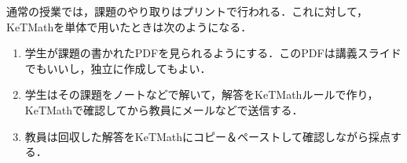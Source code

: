 \documentclass[a4j,12pt]{ujarticle}
\begin{document}
通常の授業では，課題のやり取りはプリントで行われる．これに対して，
KeTMathを単体で用いたときは次のようになる．\vspace{-1mm}
\begin{enumerate}
\item 学生が課題の書かれたPDFを見られるようにする．このPDFは講義スライドでもいいし，独立に作成してもよい．\vspace{-2mm}
\item 学生はその課題をノートなどで解いて，解答をKeTMathルールで作り，
KeTMathで確認してから教員にメールなどで送信する．\vspace{-2mm}
\item 教員は回収した解答をKeTMathにコピー＆ペーストして確認しながら採点する．\vspace{-1mm}
\end{enumerate}
\end{document}

